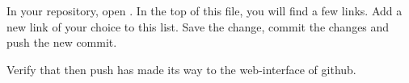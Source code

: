 In your  repository, open . In the top of this file, you will find a few links. Add a new link of your choice to this list. Save the change, commit the changes and push the new commit.

Verify that then push has made its way to the web-interface of github.

